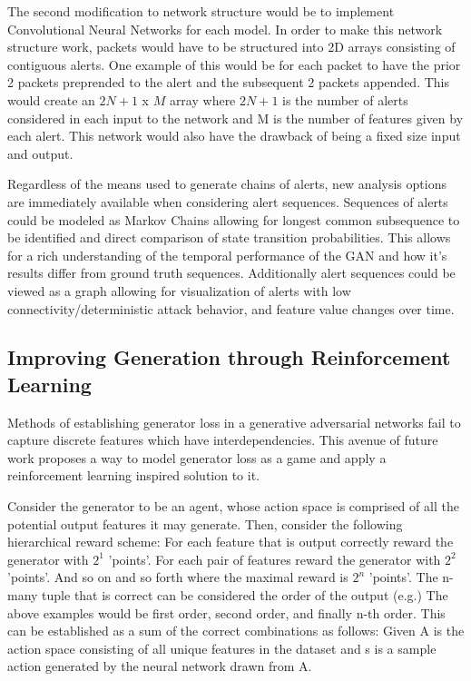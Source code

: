 The second modification to network structure would be to implement Convolutional Neural Networks for each model. In order to make this network structure work, packets would have to be structured into 2D arrays consisting of contiguous alerts. One example of this would be for each packet to have the prior 2 packets preprended to the alert and the subsequent 2 packets appended. This would create an $2N+1$ x $M$ array where $2N+1$ is the number of alerts considered in each input to the network and M is the number of features given by each alert. This network would also have the drawback of being a fixed size input and output. 

Regardless of the means used to generate chains of alerts, new analysis options are immediately available when considering alert sequences. Sequences of alerts could be modeled as Markov Chains allowing for longest common subsequence to be identified and direct comparison of state transition probabilities. This allows for a rich understanding of the temporal performance of the GAN and how it's results differ from ground truth sequences. Additionally alert sequences could be viewed as a graph allowing for visualization of alerts with low connectivity/deterministic attack behavior, and feature value changes over time. 


\subsection{Improving Generation through Reinforcement Learning}

Methods of establishing generator loss in a generative adversarial networks fail to capture discrete features which have interdependencies. This avenue of future work proposes a way to model generator loss as a game and apply a reinforcement learning inspired solution to it. 

Consider the generator to be an agent, whose action space is comprised of all the potential output features it may generate. Then, consider the following  hierarchical reward scheme: For each feature that is output correctly reward the generator with $2^1$ 'points'. For each pair of features reward the generator with $2^2$ 'points'. And so on and so forth where the maximal reward is $2^n$ 'points'. The n-many tuple that is correct can be considered the order of the output (e.g.) The above examples would be first order, second order, and finally n-th order. This can be established as a sum of the correct combinations as follows: Given A is the action space consisting of all unique features in the dataset	and s is a sample action generated by the neural network drawn from A.

